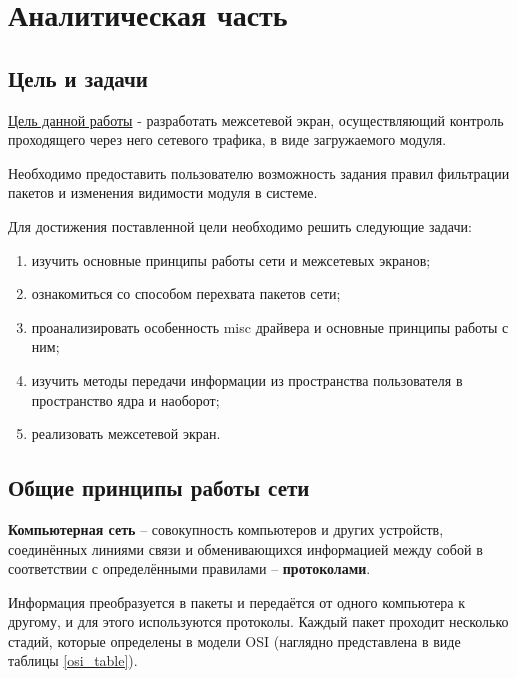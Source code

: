 \section{Аналитическая часть}

\subsection{Цель и задачи}
\underline{Цель данной работы} - разработать межсетевой экран, осуществляющий контроль проходящего через него сетевого трафика, в виде загружаемого модуля.

Необходимо предоставить пользователю возможность задания правил фильтрации пакетов и изменения видимости модуля в системе.

Для достижения поставленной цели необходимо решить следующие задачи:
\begin{enumerate}
	\item изучить основные принципы работы сети и межсетевых экранов;
	
	\item ознакомиться со способом перехвата пакетов сети;
	
	\item проанализировать особенность misc драйвера и основные принципы работы с ним;
	
	\item изучить методы передачи информации из пространства пользователя в пространство ядра и наоборот;
	
	\item реализовать межсетевой экран. \newline
\end{enumerate}

\subsection{Общие принципы работы сети}
\textbf{Компьютерная сеть} -- совокупность компьютеров и других устройств, соединённых линиями связи и обменивающихся информацией между собой в соответствии с определёнными правилами -- \textbf{протоколами}. \cite{net}

Информация преобразуется в пакеты и передаётся от одного компьютера к другому, и для этого используются протоколы. Каждый пакет проходит несколько стадий, которые определены в модели OSI (наглядно представлена в виде таблицы \ref{osi_table}).

